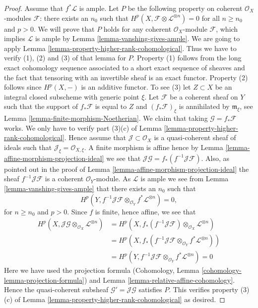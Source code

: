 \begin{proof}
\medskip\noindent
Assume that $f^*\mathcal{L}$ is ample. Let $P$ be the following property on
coherent $\mathcal{O}_X$-modules $\mathcal{F}$: there exists an $n_0$
such that $H^p(X, \mathcal{F} \otimes \mathcal{L}^{\otimes n}) = 0$
for all $n \geq n_0$ and $p > 0$. We will prove that $P$ holds
for any coherent $\mathcal{O}_X$-module $\mathcal{F}$, which implies
$\mathcal{L}$ is ample by Lemma \ref{lemma-vanshing-gives-ample}.
We are going to apply Lemma \ref{lemma-property-higher-rank-cohomological}.
Thus we have to verify (1), (2) and (3) of that lemma for $P$.
Property (1) follows from the long exact cohomology sequence associated
to a short exact sequence of sheaves and the fact that tensoring with
an invertible sheaf is an exact functor. Property (2) follows since
$H^p(X, -)$ is an additive functor. To see (3) let $Z \subset X$ be
an integral closed subscheme with generic point $\xi$.
Let $\mathcal{F}$ be a coherent sheaf on $Y$ such that
the support of $f_*\mathcal{F}$ is equal to $Z$
and $(f_*\mathcal{F})_\xi$ is annihilated by $\mathfrak m_\xi$,
see Lemma \ref{lemma-finite-morphism-Noetherian}. We claim that
taking $\mathcal{G} = f_*\mathcal{F}$ works. We only have to verify
part (3)(c) of Lemma \ref{lemma-property-higher-rank-cohomological}.
Hence assume that $\mathcal{J} \subset \mathcal{O}_X$ is a
quasi-coherent sheaf of ideals such that
$\mathcal{J}_\xi = \mathcal{O}_{X, \xi}$.
A finite morphism is affine hence by
Lemma \ref{lemma-affine-morphism-projection-ideal} we see that
$\mathcal{J}\mathcal{G} = f_*(f^{-1}\mathcal{J}\mathcal{F})$.
Also, as pointed out in the proof of
Lemma \ref{lemma-affine-morphism-projection-ideal} the sheaf
$f^{-1}\mathcal{J}\mathcal{F}$ is a coherent $\mathcal{O}_Y$-module.
As $\mathcal{L}$ is ample we see from Lemma \ref{lemma-vanshing-gives-ample}
that there exists an $n_0$ such that
$$
H^p(Y, f^{-1}\mathcal{J}\mathcal{F}
\otimes_{\mathcal{O}_Y} f^*\mathcal{L}^{\otimes n}) = 0,
$$
for $n \geq n_0$ and $p > 0$. Since $f$ is finite, hence affine, we see that
\begin{align*}
H^p(X, \mathcal{J}\mathcal{G} \otimes_{\mathcal{O}_X}
\mathcal{L}^{\otimes n})
& =
H^p(X, f_*(f^{-1}\mathcal{J}\mathcal{F}) \otimes_{\mathcal{O}_X}
\mathcal{L}^{\otimes n}) \\
& =
H^p(X, f_*(f^{-1}\mathcal{J}\mathcal{F} \otimes_{\mathcal{O}_Y}
f^*\mathcal{L}^{\otimes n})) \\
& =
H^p(Y, f^{-1}\mathcal{J}\mathcal{F} \otimes_{\mathcal{O}_Y}
f^*\mathcal{L}^{\otimes n}) = 0
\end{align*}
Here we have used the projection formula
(Cohomology, Lemma \ref{cohomology-lemma-projection-formula}) and
Lemma \ref{lemma-relative-affine-cohomology}.
Hence the quasi-coherent subsheaf $\mathcal{G}' = \mathcal{J}\mathcal{G}$
satisfies $P$. This verifies property (3)(c) of
Lemma \ref{lemma-property-higher-rank-cohomological} as desired.
\end{proof}

